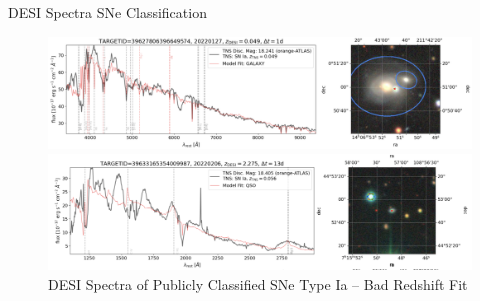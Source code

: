 \begin{frame}{DESI Spectra SNe Classification}
    \begin{figure}[t]
        \centering
        \includegraphics[width=\textwidth]{figures/desi_figures/SNe_Detection.png}
        \caption{DESI Spectra of Publicly Classified SNe Type Ia}
        \label{fig:desi_supernova}
        \includegraphics[width=\textwidth]{figures/desi_figures/SNe_detection_desifail.png}
        \caption{DESI Spectra of Publicly Classified SNe Type Ia -- Bad Redshift Fit}
        \label{fig:desi_supernova_fail}
    \end{figure}
\end{frame}


